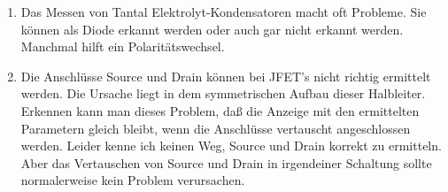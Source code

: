 \begin{enumerate}
\item Das Messen von Tantal Elektrolyt-Kondensatoren macht oft Probleme.
Sie können als Diode erkannt werden oder auch gar nicht erkannt werden.
Manchmal hilft ein Polaritätswechsel.

\item Die Anschlüsse Source und Drain können bei JFET's nicht richtig ermittelt werden.
Die Ursache liegt in dem symmetrischen Aufbau dieser Halbleiter.
Erkennen kann man dieses Problem, daß die Anzeige mit den ermittelten Parametern gleich bleibt,
wenn die Anschlüsse vertauscht angeschlossen werden.
Leider kenne ich keinen Weg, Source und Drain korrekt zu ermitteln.
Aber das Vertauschen von Source und Drain in irgendeiner Schaltung sollte normalerweise kein Problem verursachen.

\end{enumerate}
